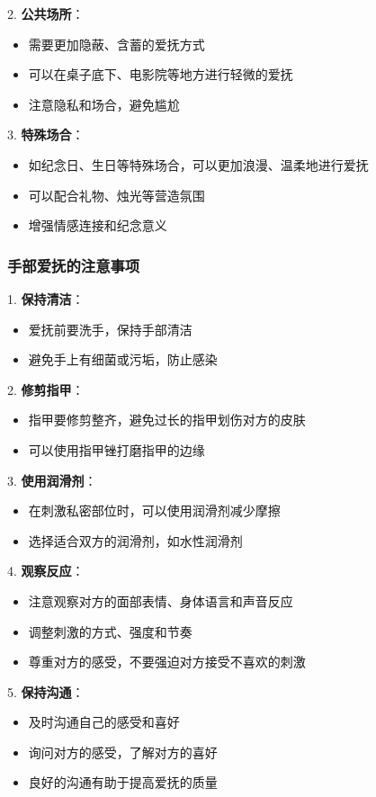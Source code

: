 \documentclass[12pt,UTF8]{ctexbook}
\begin{document}
2. \textbf{公共场所}：
  \begin{itemize}
  \item 需要更加隐蔽、含蓄的爱抚方式
  \item 可以在桌子底下、电影院等地方进行轻微的爱抚
  \item 注意隐私和场合，避免尴尬
  \end{itemize}

3. \textbf{特殊场合}：
  \begin{itemize}
  \item 如纪念日、生日等特殊场合，可以更加浪漫、温柔地进行爱抚
  \item 可以配合礼物、烛光等营造氛围
  \item 增强情感连接和纪念意义
  \end{itemize}

\subsubsection{手部爱抚的注意事项}

1. \textbf{保持清洁}：
  \begin{itemize}
  \item 爱抚前要洗手，保持手部清洁
  \item 避免手上有细菌或污垢，防止感染
  \end{itemize}

2. \textbf{修剪指甲}：
  \begin{itemize}
  \item 指甲要修剪整齐，避免过长的指甲划伤对方的皮肤
  \item 可以使用指甲锉打磨指甲的边缘
  \end{itemize}

3. \textbf{使用润滑剂}：
  \begin{itemize}
  \item 在刺激私密部位时，可以使用润滑剂减少摩擦
  \item 选择适合双方的润滑剂，如水性润滑剂
  \end{itemize}

4. \textbf{观察反应}：
  \begin{itemize}
  \item 注意观察对方的面部表情、身体语言和声音反应
  \item 调整刺激的方式、强度和节奏
  \item 尊重对方的感受，不要强迫对方接受不喜欢的刺激
  \end{itemize}

5. \textbf{保持沟通}：
  \begin{itemize}
  \item 及时沟通自己的感受和喜好
  \item 询问对方的感受，了解对方的喜好
  \item 良好的沟通有助于提高爱抚的质量
  \end{itemize}
\end{document}
